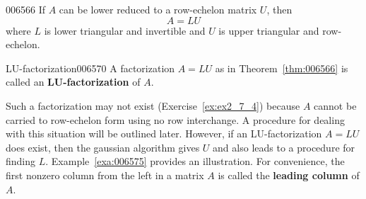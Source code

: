 \newpage 
\begin{theorem}{}{006566}
If $A$ can be lower reduced to a row-echelon matrix $U$, then
\begin{equation*}
A = LU
\end{equation*}
where $L$ is lower triangular and invertible and $U$ is upper triangular and row-echelon.
\end{theorem}

\begin{definition}{LU-factorization}{006570}
A factorization $A = LU$ as in Theorem~\ref{thm:006566} is called an \textbf{LU-factorization} of $A$.
\end{definition}

Such a factorization may not exist (Exercise~\ref{ex:ex2_7_4}) because $A$ cannot be carried to row-echelon form using no row interchange. A procedure for dealing with this situation will be outlined later. However, if an LU-factorization $A = LU$ does exist, then the gaussian algorithm gives $U$ and also leads to a procedure for finding $L$. Example~\ref{exa:006575} provides an illustration. For convenience, the first nonzero column from the left in a matrix $A$ is called the \textbf{leading column} of $A$.

